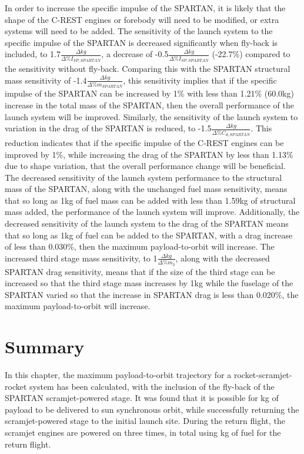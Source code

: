 In order to increase the specific impulse of the SPARTAN, it is likely that the shape of the C-REST engines or forebody will need to be modified, or extra systems will need to be added. 
 The sensitivity of the launch system to the specific impulse of the SPARTAN is decreased significantly when fly-back is included, to 1.7$\frac{\Delta kg}{\Delta\%I_{SP,SPARTAN}}$, a decrease of -0.5$\frac{\Delta kg}{\Delta\%I_{SP,SPARTAN}}$ (-22.7\%) compared to the sensitivity without fly-back. Comparing this with the SPARTAN structural mass sensitivity of -1.4$\frac{\Delta kg}{\Delta\%m_{SPARTAN}}$, this sensitivity implies that if the specific impulse of the SPARTAN can be increased by 1\% with less than 1.21\% (60.0kg) increase in the total mass of the SPARTAN, then the overall performance of the launch system will be improved.  
Similarly, the sensitivity of the launch system to variation in the drag of the SPARTAN is reduced, to -1.5$\frac{\Delta kg}{\Delta\%C_{d,SPARTAN}}$. This reduction indicates that if the specific impulse of the C-REST engines can be improved by 1\%, while increasing the drag of the SPARTAN by less than 1.13\% due to shape variation, that the overall performance change will be beneficial. 
The decreased sensitivity of the launch system performance to the structural mass of the SPARTAN, along with the unchanged fuel mass sensitivity, means that so long as 1kg of fuel mass can be added with less than 1.59kg of structural mass added, the performance of the launch system will improve. Additionally, the decreased sensitivity of the launch system to the drag of the SPARTAN means that so long as 1kg of fuel can be added to the SPARTAN, with a drag increase of less than 0.030\%, then the maximum payload-to-orbit will increase. 
The increased third stage mass sensitivity, to 1$\frac{\Delta kg}{\Delta\%m_{3}}$, along with the decreased SPARTAN drag sensitivity, means that if the size of the third stage can be increased so that the third stage mass increases by 1kg while the fuselage of the SPARTAN varied so that the increase in SPARTAN drag is less than 0.020\%, the maximum payload-to-orbit will increase. 





\section{Summary}

In this chapter, the maximum payload-to-orbit trajectory for a rocket-scramjet-rocket system has been calculated, with the inclusion of the fly-back of the SPARTAN scramjet-powered stage. It was found that it is possible for \PayloadToOrbitStandard kg of payload to be delivered to sun synchronous orbit, while successfully returning the scramjet-powered stage to the initial launch site. 
During the return flight, the scramjet engines are powered on three times, in total using \returnFuelStandard kg of fuel for the return flight.

